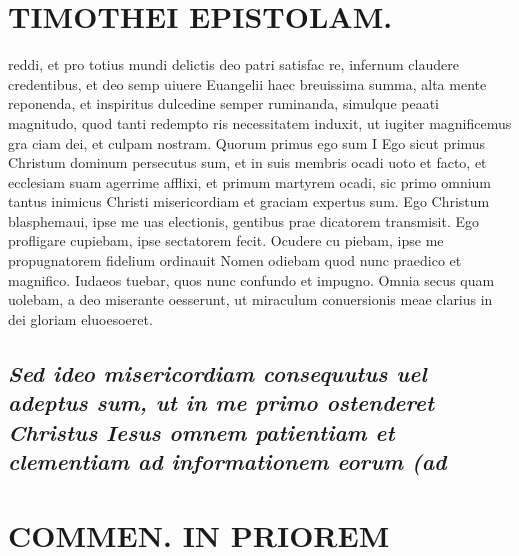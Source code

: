 \documentclass{article}
\begin{document}
\begin{pages}
\section*{TIMOTHEI EPISTOLAM. }
\marginpar{[ p.33 ]}\pstart reddi, et pro totius mundi delictis deo patri satisfac re, infernum claudere credentibus, et deo semp uiuere Euangelii haec breuissima summa, alta mente reponenda, et inspiritus dulcedine semper ruminanda, simulque peaati magnitudo, quod tanti redempto ris necessitatem induxit, ut iugiter magnificemus gra ciam dei, et culpam nostram.  \pend\pstart Quorum primus ego sum I Ego sicut primus Christum dominum persecutus sum, et in suis membris ocadi uoto et facto, et ecclesiam suam agerrime afflixi, et primum martyrem ocadi, sic primo omnium tantus inimicus Christi misericordiam et graciam expertus sum. Ego Christum blasphemaui, ipse me uas electionis, gentibus prae dicatorem transmisit. Ego profligare cupiebam, ipse sectatorem fecit. Ocudere cu piebam, ipse me propugnatorem fidelium ordinauit Nomen odiebam quod nunc praedico et magnifico. Iudaeos tuebar, quos nunc confundo et impugno. Omnia secus quam uolebam, a deo miserante oesserunt, ut miraculum conuersionis meae clarius in dei gloriam eluoesoeret.  \pend
{}
{}
\subsection*{\textit{Sed ideo misericordiam consequutus uel adeptus sum, ut in me primo ostenderet Christus Iesus omnem patientiam et clementiam ad informationem eorum (ad }}
\section*{COMMEN. IN PRIOREM }
\marginpar{[ p.34 ]}
{}

\end{pages}
\end{document}
